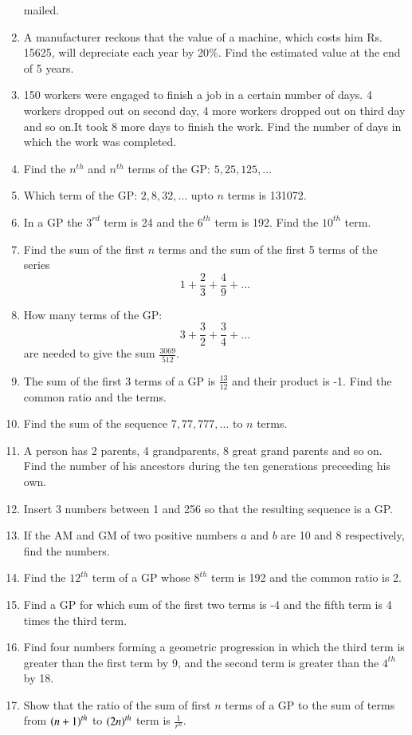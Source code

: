 \begin{enumerate}[label=\thesubsection.\arabic*.,ref=\thesubsection.\theenumi]
mailed. 
\item A manufacturer reckons that the value of a machine,  which costs him Rs. 15625,  will depreciate each year by 20\%. Find the estimated value at the end of 5 years. 
\item 150 workers were engaged to finish a job in a certain number of days. 4 workers dropped out on second day,  4 more workers dropped out on third day and so on.It took 8 more days to finish the work. Find the number of days in which the work was completed.
	\item Find the $n^{th}$ and $n^{th}$ terms of the GP: $5, 25, 125, \dots$
	\item Which term of the GP: $2, 8, 32, \dots $ upto $n$ terms is 131072.
	\item In a GP the $3^{rd}$ term is 24 and the $6^{th}$ term is 192.  Find the $10^{th}$ term.
	\item Find the sum of the first $n$ terms and the sum of the first 5 terms of the series 
		$$ 1 + \frac{2}{3}+\frac{4}{9}+\dots$$
	\item How many terms of the GP: 
		$$ 3 + \frac{3}{2}+\frac{3}{4}+\dots$$
		are needed to give the sum $\frac{3069}{512}$.
	\item The sum of the first 3 terms of a GP is 
$\frac{13}{12}$ and their product is -1.  Find the common ratio and the terms.
\item Find the sum of the sequence $7, 77, 777, \dots$ to $n$ terms.
\item A person has 2 parents, 4 grandparents, 8 great grand parents and so on.  Find the number of his ancestors during the ten generations preceeding his own.
\item Insert 3 numbers between 1 and 256 so that the resulting sequence is a GP.
\item If the AM and GM of two positive numbers $a$ and $b$ are 10 and 8 respectively, find the numbers.
\item Find the $12^{th}$ term of a GP  whose $8^{th}$ term is 192 and the common ratio is 2.
\item Find a GP  for which sum of the first two terms is -4 and the fifth term is 4 times the third term.
\item Find four numbers forming a geometric progression in which the third term is greater than the first term by 9, and the second term is greater than the $4^{th}$ by 18.
\item Show that the ratio of the sum of first $n$ terms of a GP  to the sum of terms from $\left(n+1\right)^{th}$ to $\left(2n\right)^{th}$ term is $\frac{1}{r^n}$.

\end{enumerate}
